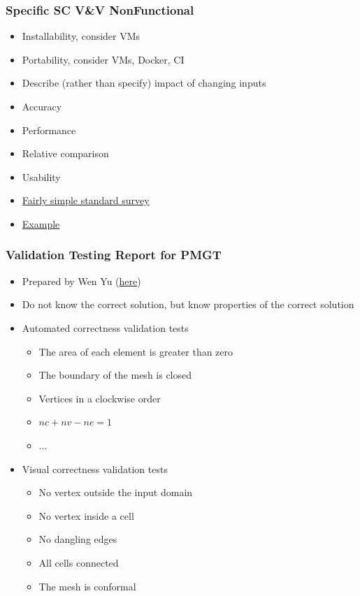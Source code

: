 \documentclass[t,12pt,numbers,fleqn]{beamer}
\begin{document}

\begin{frame}
\frametitle{Specific SC V\&V NonFunctional}

\begin{itemize}
\item Installability, consider VMs
\item Portability, consider VMs, Docker, CI
\item Describe (rather than specify) impact of changing inputs
\bi
\item Accuracy
\item Performance
\item Relative comparison
\ei
\item Usability
\bi
\item \href{https://measuringu.com/sus/}{Fairly simple standard survey}
\item \href{https://gitlab.cas.mcmaster.ca/andrem5/RogueReborn/blob/master/Doc/TestPlan/TestPlan.pdf}{Example}
\ei
\end{itemize}
\end{frame}


\begin{frame}
\frametitle{Validation Testing Report for PMGT}
\begin{itemize}
\item Prepared by Wen Yu (\href{https://gitlab.cas.mcmaster.ca/smiths/cas741/blob/master/Examples/MeshGenToolbox/doc/testingApp.pdf}{here})
\item Do not know the correct solution, but know properties of the correct solution
\item Automated correctness validation tests
\begin{itemize}
\item The area of each element is greater than zero
\item The boundary of the mesh is closed
\item Vertices in a clockwise order
\item $nc + nv - ne = 1$
\item ...
\end{itemize}
\item Visual correctness validation tests
\begin{itemize}
\item No vertex outside the input domain
\item No vertex inside a cell
\item No dangling edges
\item All cells connected
\item  The mesh is conformal
\end{itemize}
\end{itemize}
\end{frame}
\end{document}
